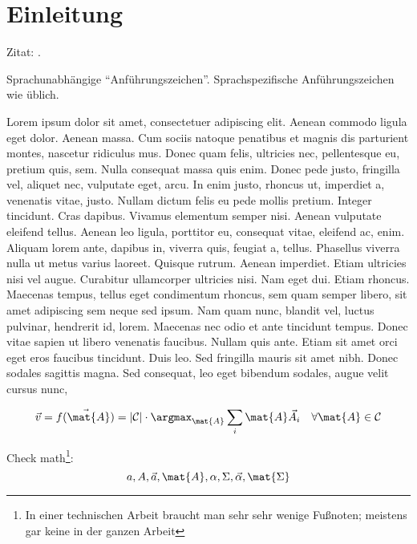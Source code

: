\chapter{Einleitung}

Zitat: \cite{Bronstein08:TDM,LongURL}.

Sprachunabhängige \enquote{Anführungszeichen}. Sprachspezifische Anführungszeichen wie üblich.

Lorem ipsum dolor sit amet, consectetuer adipiscing elit. Aenean commodo ligula 
eget dolor. Aenean massa. Cum sociis natoque penatibus et magnis dis parturient 
montes, nascetur ridiculus mus. Donec quam felis, ultricies nec, pellentesque 
eu, pretium quis, sem. Nulla consequat massa quis enim. Donec pede justo, 
fringilla vel, aliquet nec, vulputate eget, arcu. In enim justo, rhoncus ut, 
imperdiet a, venenatis vitae, justo. Nullam dictum felis eu pede mollis pretium. 
Integer tincidunt. Cras dapibus. Vivamus elementum semper nisi. Aenean vulputate 
eleifend tellus. Aenean leo ligula, porttitor eu, consequat vitae, eleifend ac, 
enim. Aliquam lorem ante, dapibus in, viverra quis, feugiat a, tellus. Phasellus 
viverra nulla ut metus varius laoreet. Quisque rutrum. Aenean imperdiet. Etiam 
ultricies nisi vel augue. Curabitur ullamcorper ultricies nisi. Nam eget dui. 
Etiam rhoncus. Maecenas tempus, tellus eget condimentum rhoncus, sem quam semper 
libero, sit amet adipiscing sem neque sed ipsum. Nam quam nunc, blandit vel, 
luctus pulvinar, hendrerit id, lorem. Maecenas nec odio et ante tincidunt 
tempus. Donec vitae sapien ut libero venenatis faucibus. Nullam quis ante. Etiam 
sit amet orci eget eros faucibus tincidunt. Duis leo. Sed fringilla mauris sit 
amet nibh. Donec sodales sagittis magna. Sed consequat, leo eget bibendum 
sodales, augue velit cursus nunc, 

\begin{equation}
\vec{v} = \vec{f(\mat{A})} = |{\cal C}| \cdot \argmax_{\mat{A}}  \sum_i{\mat{A}\vec{A}_i}
\quad\forall\mat{A}\in{\cal C}
\end{equation}

Check math\footnote{In einer technischen Arbeit braucht man sehr sehr wenige Fußnoten; meistens gar keine in der ganzen Arbeit}:
%
\begin{equation}
a, A, \vec{a}, \mat{A}, \alpha, \Sigma, \vec{\alpha}, \mat{\Sigma}
\end{equation}

